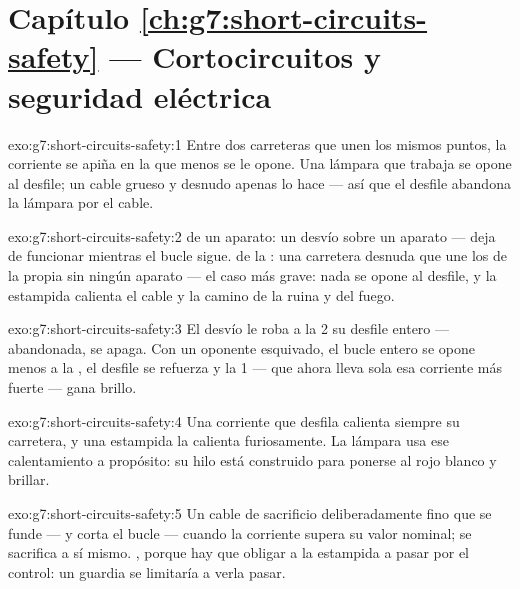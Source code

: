 \section*{Capítulo \ref{ch:g7:short-circuits-safety} --- Cortocircuitos y seguridad eléctrica}

\begin{solution}{exo:g7:short-circuits-safety:1}
Entre dos carreteras que unen los mismos puntos, la corriente se apiña
en la que menos se le opone. Una lámpara que trabaja se opone al
desfile; un cable grueso y desnudo apenas lo hace --- así que el
desfile abandona la lámpara por el cable.
\end{solution}

\begin{solution}{exo:g7:short-circuits-safety:2}
 de un aparato: un desvío sobre un aparato --- deja de
funcionar mientras el bucle sigue.  de la : una
carretera desnuda que une los  de la propia  sin
ningún aparato --- el caso más grave: nada se opone al desfile, y la
estampida calienta el cable y la  camino de la ruina y
del fuego.
\end{solution}

\begin{solution}{exo:g7:short-circuits-safety:3}
El desvío le roba a la  2 su desfile entero ---
abandonada, se apaga. Con un oponente esquivado, el bucle entero se
opone menos a la , el desfile se refuerza y la
 1 --- que ahora lleva sola esa corriente más fuerte ---
gana brillo.
\end{solution}

\begin{solution}{exo:g7:short-circuits-safety:4}
Una corriente que desfila calienta siempre su carretera, y una
estampida la calienta furiosamente. La lámpara usa ese calentamiento a
propósito: su hilo está construido para ponerse al rojo blanco y
brillar.
\end{solution}

\begin{solution}{exo:g7:short-circuits-safety:5}
Un cable de sacrificio deliberadamente fino que se funde --- y corta
el bucle --- cuando la corriente supera su valor nominal; se sacrifica
a sí mismo. , porque hay que obligar a la estampida a
pasar por el control: un guardia  se limitaría a verla
pasar.
\end{solution}

